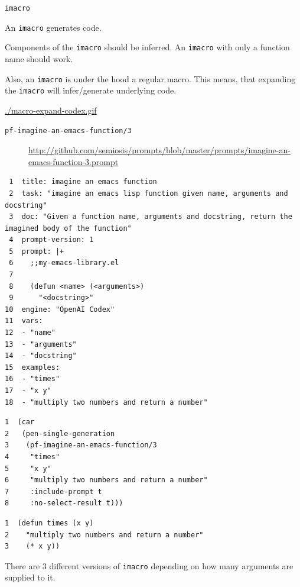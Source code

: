 \documentclass[presentation]{beamer}
\begin{document}
\begin{frame}[label={sec:org5716501},fragile]{\texttt{imacro}}
 {\tiny
An \texttt{imacro} generates code.

Components of the \texttt{imacro} should be inferred.
An \texttt{imacro} with only a function name should
work.

Also, an \texttt{imacro} is under the hood a regular
macro. This means, that expanding the \texttt{imacro}
will infer/generate underlying code.
}

\url{./macro-expand-codex.gif}

\begin{description}
\item[{\texttt{pf-imagine-an-emacs-function/3}}] \url{http://github.com/semiosis/prompts/blob/master/prompts/imagine-an-emacs-function-3.prompt}
\end{description}

\begin{verbatim}
 1  title: imagine an emacs function
 2  task: "imagine an emacs lisp function given name, arguments and docstring"
 3  doc: "Given a function name, arguments and docstring, return the imagined body of the function"
 4  prompt-version: 1
 5  prompt: |+
 6    ;;my-emacs-library.el
 7  
 8    (defun <name> (<arguments>)
 9      "<docstring>"
10  engine: "OpenAI Codex"
11  vars:
12  - "name"
13  - "arguments"
14  - "docstring"
15  examples:
16  - "times"
17  - "x y"
18  - "multiply two numbers and return a number"
\end{verbatim}

\begin{verbatim}
1  (car
2   (pen-single-generation
3    (pf-imagine-an-emacs-function/3
4     "times"
5     "x y"
6     "multiply two numbers and return a number"
7     :include-prompt t
8     :no-select-result t)))
\end{verbatim}

\begin{verbatim}
1  (defun times (x y)
2    "multiply two numbers and return a number"
3    (* x y))
\end{verbatim}

There are 3 different versions of \texttt{imacro}
depending on how many arguments are supplied to
it.


\end{frame}
\end{document}
